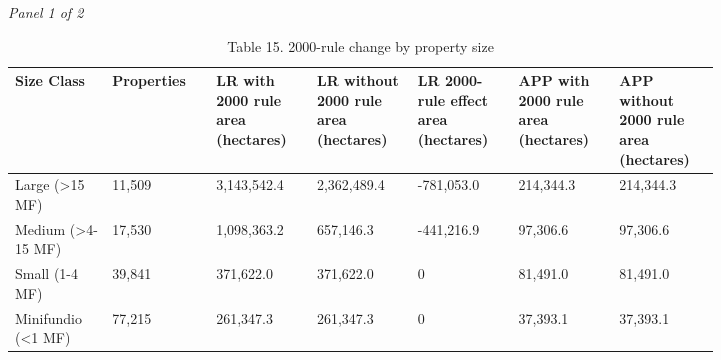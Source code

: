 \documentclass[12pt]{article}
\begin{document}
\begin{landscape}
\begin{table}[H]
\centering
\caption{Table 15. 2000-rule change by property size}
\textit{Panel 1 of 2}\\[2pt]
{\fontsize{12}{14}\selectfont
\setlength{\tabcolsep}{3pt}
\renewcommand{\arraystretch}{1.08}
\begin{tabular}{p{0.117\linewidth}p{0.117\linewidth}p{0.117\linewidth}p{0.117\linewidth}p{0.117\linewidth}p{0.117\linewidth}p{0.117\linewidth}}
\toprule
Size Class & Properties & LR with 2000 rule area (hectares) & LR without 2000 rule area (hectares) & LR 2000-rule effect area (hectares) & APP with 2000 rule area (hectares) & APP without 2000 rule area (hectares) \\
\midrule
Large (>15 MF) & 11,509 & 3,143,542.4 & 2,362,489.4 & -781,053.0 & 214,344.3 & 214,344.3 \\
Medium (>4-15 MF) & 17,530 & 1,098,363.2 & 657,146.3 & -441,216.9 & 97,306.6 & 97,306.6 \\
Small (1-4 MF) & 39,841 & 371,622.0 & 371,622.0 & 0 & 81,491.0 & 81,491.0 \\
Minifundio (<1 MF) & 77,215 & 261,347.3 & 261,347.3 & 0 & 37,393.1 & 37,393.1 \\
\bottomrule
\end{tabular}
}

\vspace{0.6em}


\end{table}
\end{landscape}
\end{document}
